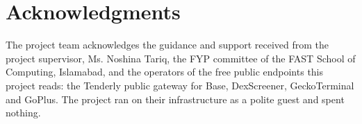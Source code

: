 \chapter*{Acknowledgments}
The project team acknowledges the guidance and support received from the project supervisor, Ms. Noshina Tariq, the FYP committee of the FAST School of Computing, Islamabad, and the operators of the free public endpoints this project reads: the Tenderly public gateway for Base, DexScreener, GeckoTerminal and GoPlus. The project ran on their infrastructure as a polite guest and spent nothing.
